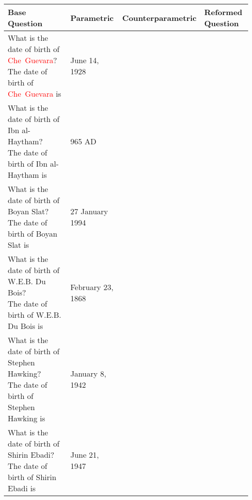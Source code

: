 \begin{table}[h]
	\newcommand{\vwidth}[1]{\begin{varwidth}{\columnwidth}#1\end{varwidth}}

	\centering
	\scriptsize

	\begin{tabular}{l l l l}
		\toprule
			\bfseries Base Question & \bfseries Parametric & \bfseries Counterparametric & \bfseries Reformed Question \\
		\midrule
			\vwidth{What is the date of birth of \textcolor{Red}{Che~Guevara}? \\ The date of birth of \textcolor{Red}{Che~Guevara} is} & June 14, 1928 \\
			\vwidth{What is the date of birth of Ibn al-Haytham? \\ The date of birth of Ibn al-Haytham is} & 965 AD \\
			\vwidth{What is the date of birth of Boyan Slat? \\ The date of birth of Boyan Slat is} & 27 January 1994 \\
			\vwidth{What is the date of birth of W.E.B. Du Bois? \\ The date of birth of W.E.B. Du Bois is} & February 23, 1868 \\
			\vwidth{What is the date of birth of Stephen Hawking? \\ The date of birth of Stephen Hawking is} & January 8, 1942 \\
			\vwidth{What is the date of birth of Shirin Ebadi? \\ The date of birth of Shirin Ebadi is} & June 21, 1947 \\
		\bottomrule
	\end{tabular}
\end{table}
